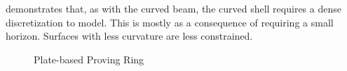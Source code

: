  demonstrates that, as with the curved beam, the curved shell requires a dense discretization to model.
This is mostly as a consequence of requiring a small horizon.
Surfaces with less curvature are less constrained.

%
\begin{figure}[tbhp]
  \centering
  \resizebox{0.8\linewidth}{!}{}
  \caption{Plate-based Proving Ring}
  \label{fig:PlateRing_n}
\end{figure}
%


